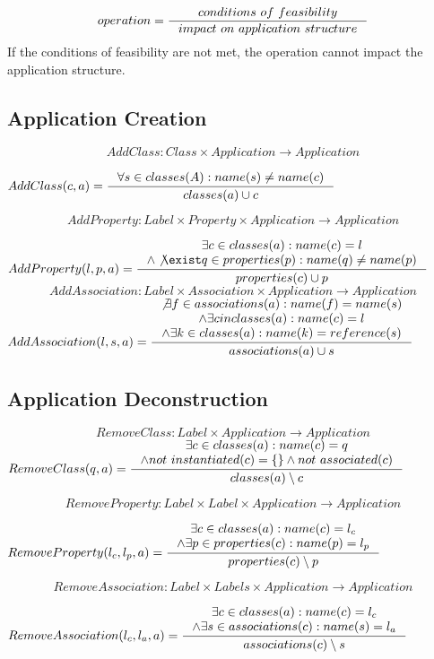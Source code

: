 \documentclass[11pt]{article}
\begin{document}
$$
operation = \inference{conditions$ $of$ $feasibility}{impact$ $on$ $application$ $structure}
$$
If the conditions of feasibility are not met, the operation cannot impact the application structure.


\subsection{Application Creation}
$$AddClass: Class \times Application \rightarrow Application $$

$
AddClass(c, a) = \inference{\forall s \in classes(A) : name(s) \neq name(c)}
{classes(a) \cup c}
$

$$AddProperty : Label \times Property \times Application \rightarrow Application $$

$
AddProperty(l, p, a) = \inference{\exists c \in classes(a) : name(c) = l \\ \wedge \not \exist q \in properties(p) : name(q) \neq name(p)}{
 properties(c) \cup p }
$
$$AddAssociation : Label \times Association \times Application \rightarrow Application $$
$
AddAssociation(l, s, a) = \inference{\not \exists f \in associations(a) : name(f) = name(s) \\ \wedge \exists c in classes(a) : name(c) = l \\ \wedge \exists k \in classes(a) : name(k) = reference(s) }{associations(a) \cup s}
$

\subsection{Application Deconstruction}
$$RemoveClass: Label \times Application \rightarrow Application $$
$
RemoveClass(q, a) = \inference{\exists c \in classes(a) : name(c) = q \\
\wedge not$ $instantiated(c) = \{ \} \wedge not$ $associated(c)}{classes(a) \setminus c }
$

$$RemoveProperty: Label \times Label \times Application \rightarrow Application $$

$
RemoveProperty(l_c, l_p, a) = \inference{\exists c \in classes(a) : name(c) = l_c \\ \wedge \exists p \in properties(c) : name(p) = l_p}{properties(c) \setminus p }
$

$$RemoveAssociation : Label \times Labels \times Application \rightarrow Application $$

$
RemoveAssociation(l_c, l_a, a) = \inference{\exists c \in classes(a) : name(c) = l_c \\ \wedge \exists s \in associations(c) : name(s) = l_a }{associations(c) \setminus s}
$
\end{document}
